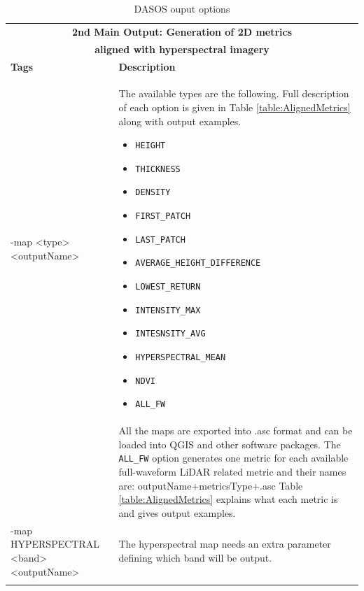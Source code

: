 \documentclass{subfiles}
\begin{document}
			\begin{longtable}	 	
		 	{|p{3.2cm}|p{10.4cm}|}
	 			\toprule
	 			\multicolumn{2}{|c|}{\textbf{2nd Main Output: Generation of 2D metrics}} \\
	 			\multicolumn{2}{|c|}{\textbf{aligned with hyperspectral imagery }} \\
	 			\midrule
	 			\textbf{Tags}  & \textbf{Description}  \\
	 			
	 			\midrule
	 			-map <type>\newline <outputName>    & The available types are the following. Full description of each option is given in Table \ref{table:AlignedMetrics} along with output examples. 
	 			\begin{itemize}[noitemsep]
	 				\item \verb|HEIGHT|
	 				\item \verb|THICKNESS|
	 				\item \verb|DENSITY |
	 				\item \verb|FIRST_PATCH|
	 				\item \verb|LAST_PATCH|
	 				\item \verb|AVERAGE_HEIGHT_DIFFERENCE|
	 				\item \verb|LOWEST_RETURN|
	 				\item \verb|INTENSITY_MAX|
	 				\item \verb|INTESNSITY_AVG|
	 				\item \verb|HYPERSPECTRAL_MEAN|
	 				\item \verb|NDVI|
	 				\item \verb|ALL_FW| 
	 			\end{itemize} \\
	 			&  All the maps are exported into .asc format and can be loaded into QGIS and other software packages. The \verb|ALL_FW| option generates one metric for each available full-waveform LiDAR related metric and their names are: outputName+metricsType+.asc \newline
	 			Table \ref{table:AlignedMetrics} explains what each metric is and gives output examples.\\
	 			\cmidrule(r){1-1}\cmidrule(l){2-2}
	 			-map \newline HYPERSPECTRAL \newline <band>\newline <outputName> & The hyperspectral map needs an extra parameter defining which band will be output. \\
	 			
	 			
	 			\bottomrule
	 		\caption{DASOS ouput options}
	 		\label{table:outputs}
	 	\end{longtable}
	 	
\end{document}
